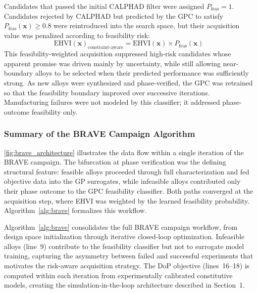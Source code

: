 \documentclass[preprint,12pt,times]{elsarticle}  %
\begin{document}
Candidates that passed the initial CALPHAD filter were assigned $P_\text{feas} = 1$. Candidates rejected by CALPHAD but predicted by the GPC to satisfy $P_\text{feas}(\mathbf{x}) \geq 0.8$ were reintroduced into the search space, but their acquisition value was penalized according to feasibility risk:
\begin{equation}
    \textrm{EHVI}(\mathbf{x})_{\textrm{constraint-aware}} = \textrm{EHVI}(\mathbf{x}) \times P_{\textrm{feas}}(\mathbf{x})
\end{equation}
This feasibility-weighted acquisition suppressed high-risk candidates whose apparent promise was driven mainly by uncertainty, while still allowing near-boundary alloys to be selected when their predicted performance was sufficiently strong. As new alloys were synthesized and phase-verified, the GPC was retrained so that the feasibility boundary improved over successive iterations. Manufacturing failures were not modeled by this classifier; it addressed phase-outcome feasibility only.

\subsubsection{Summary of the BRAVE Campaign Algorithm}

\autoref{fig:brave_architecture} illustrates the data flow within a single iteration of the BRAVE campaign. The bifurcation at phase verification was the defining structural feature: feasible alloys proceeded through full characterization and fed objective data into the GP surrogates, while infeasible alloys contributed only their phase outcome to the GPC feasibility classifier. Both paths converged at the acquisition step, where EHVI was weighted by the learned feasibility probability. Algorithm~\ref{alg:brave} formalizes this workflow.

Algorithm~\ref{alg:brave} consolidates the full BRAVE campaign workflow, from design space initialization through iterative closed-loop optimization. Infeasible alloys (line~9) contribute to the feasibility classifier but not to surrogate model training, capturing the asymmetry between failed and successful experiments that motivates the risk-aware acquisition strategy. The DoP objective (lines~16--18) is computed within each iteration from experimentally calibrated constitutive models, creating the simulation-in-the-loop architecture described in Section~1.
\end{document}
